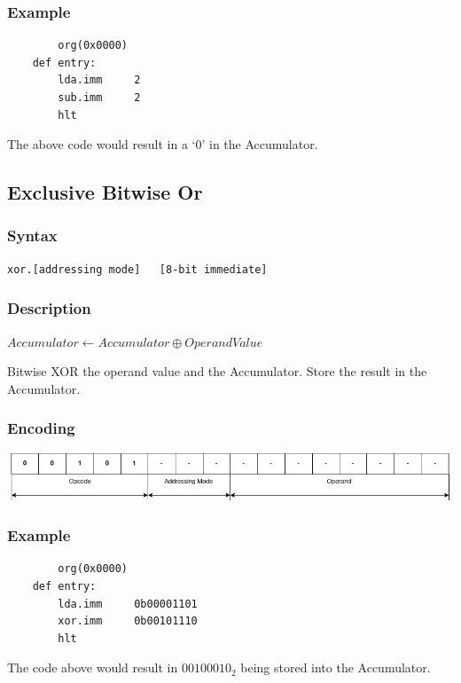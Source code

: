     \subsubsection{Example}
    \begin{verbatim}
        org(0x0000)
    def entry:
        lda.imm     2
        sub.imm     2
        hlt
    \end{verbatim}
    \par The above code would result in a `0' in the Accumulator.

\pagebreak
\subsection{Exclusive Bitwise Or}\label{subsec:xor}
    \subsubsection{Syntax}
    \begin{verbatim}xor.[addressing mode]   [8-bit immediate]\end{verbatim}

    \subsubsection{Description}
    $Accumulator \leftarrow Accumulator \oplus OperandValue$
    \par Bitwise XOR the operand value and the Accumulator.
    Store the result in the Accumulator.

    \subsubsection{Encoding}
    \begin{center}
        \includegraphics[scale=0.40]{img/Andromeda-XOR.drawio}
    \end{center}

    \subsubsection{Example}
    \begin{verbatim}
        org(0x0000)
    def entry:
        lda.imm     0b00001101
        xor.imm     0b00101110
        hlt
    \end{verbatim}
    \par The code above would result in $00100010_{2}$ being stored into the Accumulator.


